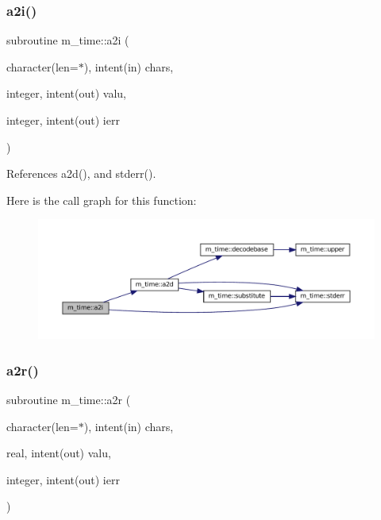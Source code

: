 \subsubsection{\texorpdfstring{a2i()}{a2i()}}
{\footnotesize\ttfamily subroutine m\+\_\+time\+::a2i (\begin{DoxyParamCaption}\item[{character(len=$\ast$), intent(in)}]{chars,  }\item[{integer, intent(out)}]{valu,  }\item[{integer, intent(out)}]{ierr }\end{DoxyParamCaption})\hspace{0.3cm}{\ttfamily [private]}}



References a2d(), and stderr().

Here is the call graph for this function\+:\nopagebreak
\begin{figure}[H]
\begin{center}
\leavevmode
\includegraphics[width=350pt]{namespacem__time_a200e48a4e0096b4343b0b72c95becd3d_cgraph}
\end{center}
\end{figure}
\mbox{\label{namespacem__time_a85f3492133b49248e415771ff4da0b95}} 
\subsubsection{\texorpdfstring{a2r()}{a2r()}}
{\footnotesize\ttfamily subroutine m\+\_\+time\+::a2r (\begin{DoxyParamCaption}\item[{character(len=$\ast$), intent(in)}]{chars,  }\item[{real, intent(out)}]{valu,  }\item[{integer, intent(out)}]{ierr }\end{DoxyParamCaption})\hspace{0.3cm}{\ttfamily [private]}}




